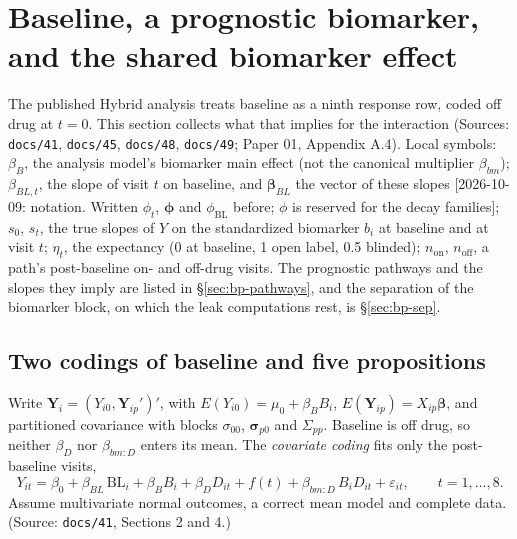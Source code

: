 \documentclass[11pt]{article}
\newcommand{\note}[1]{\textcolor{blue!60!black}{\small [#1]}}
\newcommand{\code}[1]{\texttt{#1}}
\begin{document}
\section{Baseline, a prognostic biomarker, and the shared biomarker
effect}
\label{sec:bp-prog}

The published Hybrid analysis treats baseline as a ninth response row,
coded off drug at $t = 0$. This section collects what that implies for
the interaction (Sources: \code{docs/41}, \code{docs/45},
\code{docs/48}, \code{docs/49}; Paper 01, Appendix A.4). Local symbols:
$\beta_B$, the analysis model's biomarker main effect (not the
canonical multiplier $\beta_{bm}$); $\beta_{BL,t}$, the slope of visit $t$ on
baseline, and $\boldsymbol\beta_{BL}$ the vector of these slopes
\note{2026-10-09: notation. Written $\phi_t$, $\boldsymbol\phi$ and
$\phi_{\mathrm{BL}}$ before; $\phi$ is reserved for the decay
families}; $s_0$, $s_t$, the true slopes of $Y$ on the standardized
biomarker $b_i$ at baseline and at visit $t$; $\eta_t$, the expectancy
(0 at baseline, 1 open label, 0.5 blinded); $n_{\text{on}}$,
$n_{\text{off}}$, a path's post-baseline on- and off-drug visits.
The prognostic pathways and the slopes they imply are listed in
\S\ref{sec:bp-pathways}, and the separation of the biomarker block, on
which the leak computations rest, is \S\ref{sec:bp-sep}.

\subsection{Two codings of baseline and five propositions}

Write $\mathbf{Y}_i = (Y_{i0}, \mathbf{Y}_{ip}')'$, with
$E(Y_{i0}) = \mu_0 + \beta_B B_i$, $E(\mathbf{Y}_{ip}) =
X_{ip}\boldsymbol\beta$, and partitioned covariance with blocks
$\sigma_{00}$, $\boldsymbol\sigma_{p0}$ and $\Sigma_{pp}$. Baseline is
off drug, so neither $\beta_D$ nor $\beta_{bm:D}$ enters its mean. The
\emph{covariate coding} fits only the post-baseline visits,
\begin{equation}
Y_{it} = \beta_0 + \beta_{BL}\,\mathrm{BL}_i + \beta_B B_i
  + \beta_D D_{it} + f(t) + \beta_{bm:D}\,B_i D_{it} + \varepsilon_{it},
  \qquad t = 1, \dots, 8 .
\label{eq:bp-ancova}
\end{equation}
Assume multivariate normal outcomes, a correct mean model and complete
data. (Source: \code{docs/41}, Sections 2 and 4.)
\end{document}
